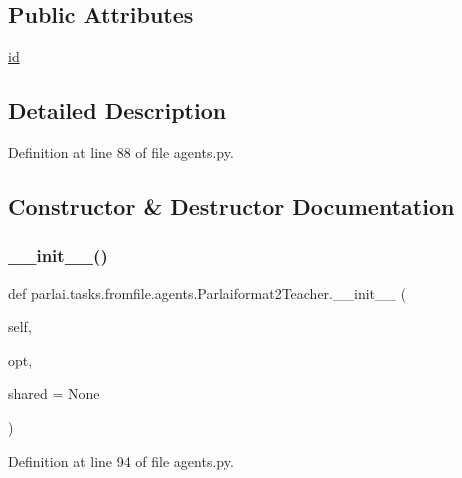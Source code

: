 \subsection*{Public Attributes}
\begin{DoxyCompactItemize}
\item 
\hyperlink{classparlai_1_1tasks_1_1fromfile_1_1agents_1_1Parlaiformat2Teacher_aeea3091d7296c9abc5376a3b920a31b8}{id}
\end{DoxyCompactItemize}


\subsection{Detailed Description}


Definition at line 88 of file agents.\+py.



\subsection{Constructor \& Destructor Documentation}
\mbox{\label{classparlai_1_1tasks_1_1fromfile_1_1agents_1_1Parlaiformat2Teacher_a18904cf2f5851ea2f1ee37136a0efb2b}} 
\subsubsection{\texorpdfstring{\+\_\+\+\_\+init\+\_\+\+\_\+()}{\_\_init\_\_()}}
{\footnotesize\ttfamily def parlai.\+tasks.\+fromfile.\+agents.\+Parlaiformat2\+Teacher.\+\_\+\+\_\+init\+\_\+\+\_\+ (\begin{DoxyParamCaption}\item[{}]{self,  }\item[{}]{opt,  }\item[{}]{shared = {\ttfamily None} }\end{DoxyParamCaption})}



Definition at line 94 of file agents.\+py.


